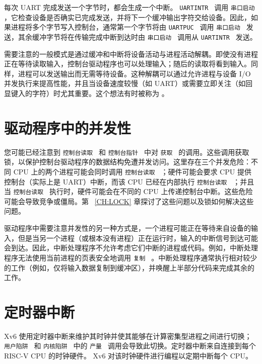 \documentclass[UTF8]{article}
\begin{document}
每次 UART 完成发送一个字节时，都会生成一个中断。
  {    \tt    UARTINTR   }  调用  {    \tt    串口启动   }  ，它检查设备是否确实已完成发送，并将下一个缓冲输出字符交给设备。因此，如果进程将多个字节写入控制台，通常第一个字节将由  {    \tt    UARTPUC   }  调用  {    \tt    串口启动   }  发送，其余缓冲字节将在传输完成中断到达时由  {    \tt    串口启动   }  调用从  {    \tt    UARTINTR   }  发送。  

需要注意的一般模式是通过缓冲和中断将设备活动与进程活动解耦。即使没有进程正在等待读取输入，控制台驱动程序也可以处理输入；随后的读取将看到输入。同样，进程可以发送输出而无需等待设备。这种解耦可以通过允许进程与设备 I/O 并发执行来提高性能，并且当设备速度较慢（如 UART）或需要立即关注（如回显键入的字符）时尤其重要。这个想法有时被称为        。  

   \section{驱动程序中的并发性  }     

您可能已经注意到  {    \tt    控制台读取   }  和  {    \tt    控制台指针   }  中对  {    \tt    获取   }  的调用。这些调用获取锁，以保护控制台驱动程序的数据结构免遭并发访问。这里存在三个并发危险：不同 CPU 上的两个进程可能会同时调用  {    \tt    控制台读取   } ；硬件可能会要求 CPU 提供控制台（实际上是 UART）中断，而该 CPU 已经在内部执行
  {    \tt    控制台读取   }  ；并且当  {    \tt    控制台读取   }  执行时，硬件可能会在不同的 CPU 上传递控制台中断。这些危险可能会导致竞争或僵局。第~    \ref{CH:LOCK}    章探讨了这些问题以及锁如何解决这些问题。  

驱动程序中需要注意并发性的另一种方式是，一个进程可能正在等待来自设备的输入，但是当另一个进程（或根本没有进程）正在运行时，输入的中断信号到达可能会到达。因此，中断处理程序不允许考虑它们中断的进程或代码。例如，中断处理程序无法使用当前进程的页表安全地调用  {    \tt    复制   } 。中断处理程序通常执行相对较少的工作（例如，仅将输入数据复制到缓冲区），并唤醒上半部分代码来完成其余的工作。  

   \section{定时器中断  }     

Xv6 使用定时器中断来维护其时钟并使其能够在计算密集型进程之间进行切换；  {    \tt    用户陷阱   }  和  {    \tt    内核陷阱   }  中的  {    \tt    产量   }  调用会导致此切换。定时器中断来自连接到每个 RISC-V CPU 的时钟硬件。 Xv6 对该时钟硬件进行编程以定期中断每个 CPU。  
\end{document}
